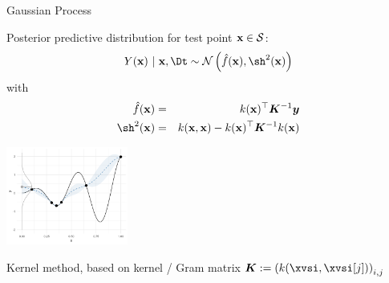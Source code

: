 \documentclass[11pt,compress,t,notes=noshow, xcolor=table]{beamer}
\begin{document}
\begin{vbframe}{Gaussian Process}


Posterior predictive distribution for test point $\mathbf{x} \in \mathcal{S}$:
\begin{eqnarray*}
  Y(\xv) ~|~ \xv, \Dt \sim \mathcal{N}\left(\fh(\xv), \sh^2(\xv)\right)
\end{eqnarray*}
with 
\begin{eqnarray*}
  \fh(\xv) &=& k(\xv)^\top \bm{K}^{-1} \bm{y} \\
  \sh^2(\xv) &=& k(\xv, \xv) - k(\xv)^\top \bm{K}^{-1} k(\xv)
\end{eqnarray*}
\begin{center}
\includegraphics[width = 0.3\textwidth]{figure_man/bayesian_loop_sm_normal.png}
\end{center}

Kernel method, based on kernel / Gram matrix $\bm{K} := \left(k(\xvsi, \xvsi[j])\right)_{i,j}$ 
\framebreak



\framebreak 


\end{vbframe}
\end{document}
